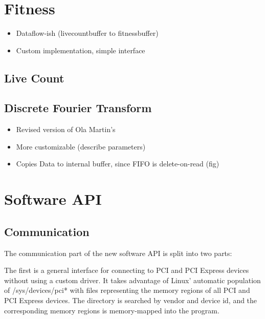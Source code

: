 
\section{Fitness}
\label{sec:fitness}

\begin{itemize}
    \item Dataflow-ish (livecountbuffer to fitnessbuffer)
    \item Custom implementation, simple interface
\end{itemize}

\subsection{Live Count}


\subsection{Discrete Fourier Transform}

\begin{itemize}
    \item Revised version of Ola Martin's
    \item More customizable (describe parameters)
    \item Copies Data to internal buffer, since FIFO is delete-on-read (fig)
\end{itemize}


\section{Software API}

\TODO

\subsection{Communication}

The communication part of the new software API is split into two parts:

The first is a general interface for connecting to PCI and PCI Express devices without using a custom driver.
It takes advantage of Linux' automatic population of /sys/devices/pci* with files representing the memory regions of all PCI and PCI Express devices.
The directory is searched by vendor and device id, and the corresponding memory regions is memory-mapped into the program.

